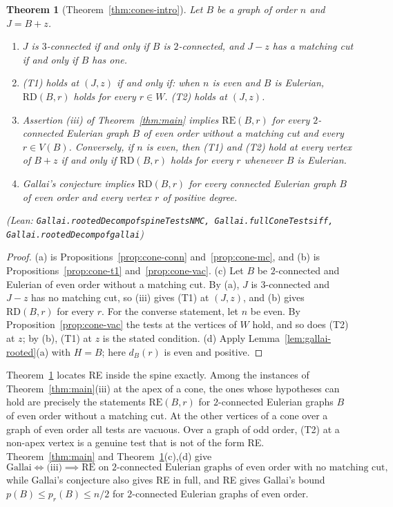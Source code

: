 \documentclass[11pt]{amsart}
\newtheorem{theorem}{Theorem}[section]
\theoremstyle{definition}
\theoremstyle{remark}
\renewcommand{\_}{\oldunderscore\allowbreak}
\newcommand{\leanst}[1]{\par{\raggedright\small\textup{(Lean: \texttt{#1})}\par}}
\newcommand{\RE}{\mathrm{RE}}
\newcommand{\pr}{p_r}
\begin{document}
\begin{theorem}[Theorem~\ref{thm:cones-intro}]\label{thm:cones}
Let $B$ be a graph of order $n$ and $J=B+z$.
\begin{enumerate}[label=\textup{(\alph*)}]
\item $J$ is $3$-connected if and only if $B$ is $2$-connected, and $J-z$ has a matching cut if and
only if $B$ has one.
\item \textup{(T1)} holds at $(J,z)$ if and only if: when $n$ is even and $B$ is Eulerian,
$\mathrm{RD}(B,r)$ holds for every $r\in W$. \textup{(T2)} holds at $(J,z)$.
\item Assertion \textup{(iii)} of Theorem~\ref{thm:main} implies $\RE(B,r)$ for every $2$-connected
Eulerian graph $B$ of even order without a matching cut and every $r\in V(B)$. Conversely, if $n$ is
even, then \textup{(T1)} and \textup{(T2)} hold at every vertex of $B+z$ if and only if
$\mathrm{RD}(B,r)$ holds for every $r$ whenever $B$ is Eulerian.
\item Gallai's conjecture implies $\mathrm{RD}(B,r)$ for every connected Eulerian graph $B$ of even
order and every vertex $r$ of positive degree.
\end{enumerate}
\leanst{Gallai.rootedDecomp\_of\_spineTestsNMC, Gallai.fullConeTests\_iff, Gallai.rootedDecomp\_of\_gallai}
\end{theorem}

\begin{proof}
(a) is Propositions~\ref{prop:cone-conn} and~\ref{prop:cone-mc}, and (b) is
Propositions~\ref{prop:cone-t1} and~\ref{prop:cone-vac}. (c) Let $B$ be $2$-connected and Eulerian
of even order without a matching cut. By (a), $J$ is $3$-connected and $J-z$ has no matching cut, so
(iii) gives (T1) at $(J,z)$, and (b) gives $\mathrm{RD}(B,r)$ for every $r$. For the converse
statement, let $n$ be even. By Proposition~\ref{prop:cone-vac} the tests at the vertices of $W$
hold, and so does (T2) at $z$; by (b), (T1) at $z$ is the stated condition. (d) Apply
Lemma~\ref{lem:gallai-rooted}(a) with $H=B$; here $d_B(r)$ is even and positive.
\end{proof}

Theorem~\ref{thm:cones} locates RE inside the spine exactly. Among the instances of
Theorem~\ref{thm:main}(iii) at the apex of a cone, the ones whose hypotheses can hold are precisely
the statements $\RE(B,r)$ for $2$-connected Eulerian graphs $B$ of even order without a matching
cut. At the other vertices of a cone over a graph of even order all tests are vacuous. Over a graph
of odd order, (T2) at a non-apex vertex is a genuine test that is not of the form RE.
Theorem~\ref{thm:main} and Theorem~\ref{thm:cones}(c),(d) give
\[
\text{Gallai}\iff\text{(iii)}\implies\RE\text{ on $2$-connected Eulerian graphs of even order
with no matching cut,}
\]
while Gallai's conjecture also gives RE in full, and RE gives Gallai's bound $p(B)\le\pr(B)\le n/2$ for
$2$-connected Eulerian graphs of even order.
\end{document}
